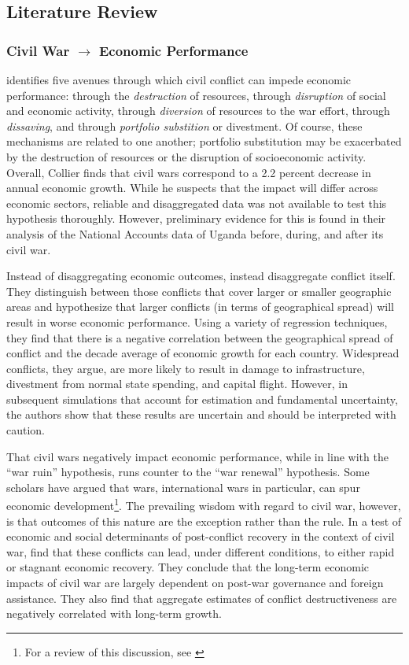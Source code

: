 \subsection{Literature Review}
\label{lit}

\subsubsection{Civil War $\rightarrow$ Economic Performance}

\cite{collier:1999} identifies five avenues through which civil conflict can impede economic performance: through the \textit{destruction} of resources, through \textit{disruption} of social and economic activity, through \textit{diversion} of resources to the war effort, through \textit{dissaving}, and through \textit{portfolio substition} or divestment. Of course, these mechanisms are related to one another; portfolio substitution may be exacerbated by the destruction of resources or the disruption of socioeconomic activity. Overall, Collier finds that civil wars correspond to a 2.2 percent decrease in annual economic growth. While he suspects that the impact will differ across economic sectors, reliable and disaggregated data was not available to test this hypothesis thoroughly. However, preliminary evidence for this is found in their analysis of the National Accounts data of Uganda before, during, and after its civil war.

Instead of disaggregating economic outcomes, \cite{imai:weinstein:2000} instead disaggregate conflict itself. They distinguish between those conflicts that cover larger or smaller geographic areas and hypothesize that larger conflicts (in terms of geographical spread) will result in worse economic performance. Using a variety of regression techniques, they find that there is a negative correlation between the geographical spread of conflict and the decade average of economic growth for each country. Widespread conflicts, they argue, are more likely to result in damage to infrastructure, divestment from normal state spending, and capital flight. However, in subsequent simulations that account for estimation and fundamental uncertainty, the authors show that these results are uncertain and should be interpreted with caution.

That civil wars negatively impact economic performance, while in line with the ``war ruin'' hypothesis, runs counter to the ``war renewal'' hypothesis. Some scholars have argued that wars, international wars in particular, can spur economic development\footnote{For a review of this discussion, see \cite{rasler:thompson:1985}}. The prevailing wisdom with regard to civil war, however, is that outcomes of this nature are the exception rather than the rule. In a test of economic and social determinants of post-conflict recovery in the context of civil war, \cite{kang:meernik:2005} find that these conflicts can lead, under different conditions, to either rapid or stagnant economic recovery. They conclude that the long-term economic impacts of civil war are largely dependent on post-war governance and foreign assistance. They also find that aggregate estimates of conflict destructiveness are negatively correlated with long-term growth.

